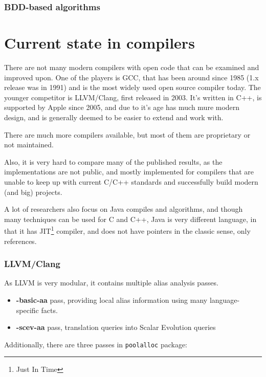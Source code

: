 \subsubsection{BDD-based algorithms}



\section{Current state in compilers}

There are not many modern compilers with open code that can be examined and improved
upon. One of the players is GCC, that has been around since 1985
(1.x release was in 1991) and is the most widely used open source compiler
today. The younger competitor is LLVM/Clang, first released in 2003. It's
written in C++, is supported by Apple since 2005, and due to it's age has much
mure modern design, and is generally deemed to be easier to extend and work
with.

There are much more compilers available, but most of them are proprietary or not
maintained.

Also, it is very hard to compare many of the published results, as the
implementations are not public, and mostly implemented for compilers that are
unable to keep up with current C/C++ standards and successfully build modern
(and big) projects.

A lot of researchers also focus on Java compiles and algorithms, and though many
techniques can be used for C and C++, Java is very different language, in that
it has JIT\footnote{Just In Time} compiler, and does not have pointers in the
classic sense, only references. 

\subsubsection{LLVM/Clang}

As LLVM is very modular, it contains multiple alias analysis passes. 

\begin{itemize}
	\item {\bf -basic-aa} pass, providing local alias information using many
		language-specific facts.
	\item {\bf -scev-aa} pass, translation queries into Scalar Evolution queries
\end{itemize}

Additionally, there are three passes in {\tt poolalloc} package:

